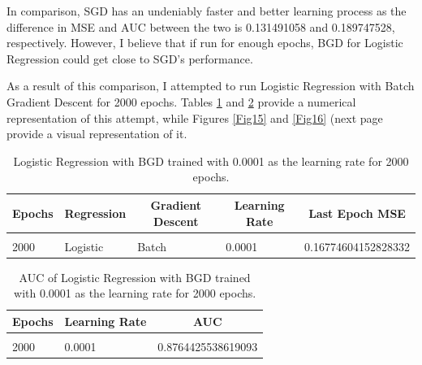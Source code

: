 \documentclass{article} %
\begin{document}
In comparison, SGD has an undeniably faster and better learning process as the difference in MSE and AUC between the two is 0.131491058 and 0.189747528, respectively. However, I believe that if run for enough epochs, BGD for Logistic Regression could get close to SGD's performance.

As a result of this comparison, I attempted to run Logistic Regression with Batch Gradient Descent for 2000 epochs. Tables \ref{Table11} and \ref{Table12} provide a numerical representation of this attempt, while Figures \ref{Fig15} and \ref{Fig16} (next page provide a visual representation of it.

\begin{table}[!htbp]
\caption{Logistic Regression with BGD trained with 0.0001 as the learning rate for 2000 epochs.}
\label{Table11}
\begin{center}
\begin{tabular}{l l l l l}
\multicolumn{1}{c}{\bf Epochs} &\multicolumn{1}{c}{\bf Regression}  &\multicolumn{1}{c}{\bf Gradient Descent} &\multicolumn{1}{c}{\bf Learning Rate} &\multicolumn{1}{c}{\bf Last Epoch MSE}
\\ \hline \\

2000 & Logistic & Batch & 0.0001 & 0.16774604152828332\\

\end{tabular}
\end{center}
\end{table}

\begin{table}[!htbp]
\caption{AUC of Logistic Regression with BGD trained with 0.0001 as the learning rate for 2000 epochs.}
\label{Table12}
\begin{center}
\begin{tabular}{l l l}
\multicolumn{1}{c}{\bf Epochs} &\multicolumn{1}{c}{\bf Learning Rate} &\multicolumn{1}{c}{\bf AUC}
\\ \hline \\

2000 & 0.0001 & 0.8764425538619093\\

\end{tabular}
\end{center}
\end{table}

\clearpage
\end{document}
